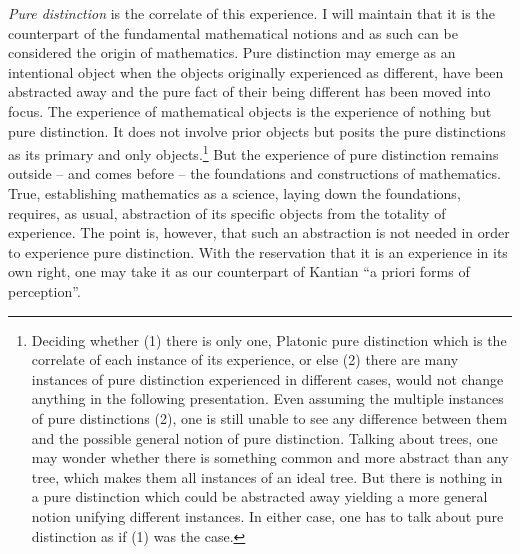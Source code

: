 {\em Pure distinction} is the correlate of this experience. 
I will maintain that it is the counterpart of the fundamental mathematical notions and 
as such can be considered the origin of mathematics. Pure distinction
 may emerge
as an intentional object when the objects originally experienced as different,
have been abstracted away and the pure fact of their being different has
been moved into focus.
The experience
of mathematical objects is the experience of nothing but pure distinction. It
does not involve prior objects but posits the pure distinctions as its primary
and only objects.\footnote {Deciding whether (1) there is only one, Platonic 
pure distinction which is the correlate of each instance of its experience, or
else (2) there are many instances of pure distinction experienced in different 
cases, would not change anything in the following presentation. Even assuming
the multiple instances of pure distinctions (2), one is still unable
to see any difference between them and the possible general notion of pure 
distinction. Talking about trees, one may wonder whether there is something
common and more abstract than any tree, which makes them all instances
of an ideal tree. But there is nothing in a pure distinction which could be 
abstracted away yielding a more general notion unifying different instances.
In either case, one has to talk about pure distinction as if (1) was the case.}
But the experience of pure distinction remains outside -- and comes before -- the foundations and constructions of mathematics. 
True, establishing mathematics as a science, laying down the foundations,
requires, as usual, abstraction of its specific objects from the totality of
experience. The point is, however, that such an abstraction is not needed in
order to experience pure distinction.
With the reservation that it is an experience in its own right, one may take it as our counterpart of Kantian ``a priori forms of perception''.


